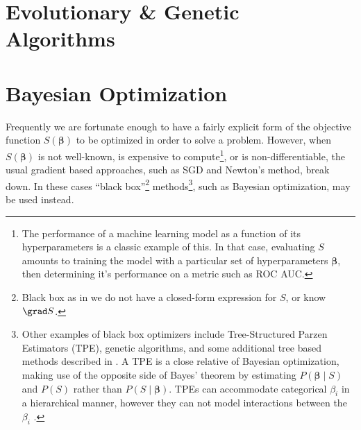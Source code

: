 \section{Evolutionary \& Genetic Algorithms}
\label{opt:evo}

\section{Bayesian Optimization}
\label{opt:BO}

Frequently we are fortunate enough to have a fairly explicit form of
the objective function $S\left(\bm{\beta}\right)$ to be optimized in order to solve a problem.
However, when $S\left(\bm{\beta}\right)$ is not well-known,
is expensive to compute\footnote{The performance of a machine learning model as a function of its hyperparameters is a classic example of this.
In that case, evaluating $S$ amounts to training the model with a particular set of hyperparameters $\bm{\beta}$,
then determining it's performance on a metric such as ROC AUC.}, or is non-differentiable,
the usual gradient based approaches, such as SGD and Newton's method, break down.
In these cases ``black box''\footnote{Black box as in
we do not have a closed-form expression for $S$, or know $\grad S$.} methods\footnote{Other examples of black box optimizers include
Tree-Structured Parzen Estimators (TPE),
genetic algorithms,
and some additional tree based methods described in \cite{Hutter2011,Hutter2014}.
A TPE is a close relative of Bayesian optimization, making use of the opposite side of Bayes' theorem by
estimating $P\left(\bm{\beta} \mid S\right)$ and $P\left(S\right)$ rather than $P\left(S \mid \bm{\beta}\right)$.
TPEs can accommodate categorical $\beta_{i}$ in a hierarchical manner,
however they can not model interactions between the $\beta_{i}$ \cite{bissuel_2019,NIPS2011_4443}.},
such as Bayesian optimization, may be used instead.

